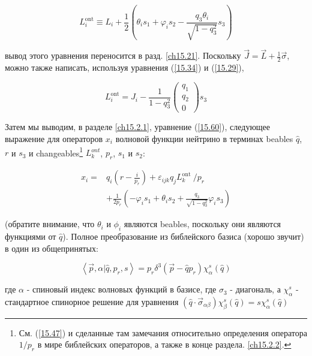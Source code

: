 \documentclass[main.tex]{subfiles}
\begin{document}
\begin{equation}\label{15.36}
	L_{i}^{\mathrm{ont}} \equiv L_{i}+\frac{1}{2}\left(\theta_{i} s_{1}+\varphi_{i} s_{2}-\frac{q_{3} \theta_{i}}{\sqrt{1-q_{3}^{2}}} s_{3}\right)
\end{equation}

вывод этого уравнения переносится в разд. \ref{ch15.21}.
Поскольку $\vec J = \vec L + \frac 1 2\vec\sigma$, можно также написать, используя уравнения (\ref{15.34}) и (\ref{15.29}),

\begin{equation}\label{15.37}
	L_{i}^{\mathrm{ont}}=J_{i}-\frac{1}{1-q_{3}^{2}}\left(\begin{array}{c}{q_{1}} \\ {q_{2}} \\ {0}\end{array}\right) s_{3}
\end{equation}

Затем мы выводим, в разделе \ref{ch15.2.1}, уравнение (\ref{15.60}), следующее выражение для операторов $x_i$ волновой функции нейтрино в терминах beables $\hat q$, $r$ и $s_3$ и changeables\footnote{См. (\ref{15.47}) и сделанные там замечания относительно определения оператора $1/p_r$ в мире библейских операторов, а также в конце раздела. \ref{ch15.2.2}.} $L_k^{ont}$, $p_r$, $s_1$ и $s_2$:

\begin{equation}\label{15.38}
	\begin{aligned} x_{i}=& q_{i}\left(r-\frac{i}{p_{r}}\right)+\varepsilon_{i j k} q_{j} L_{k}^{\text {ont }} / p_{r} \\ &+\frac{1}{2 p_{r}}\left(-\varphi_{i} s_{1}+\theta_{i} s_{2}+\frac{q_{3}}{\sqrt{1-q_{3}^{2}}} \varphi_{i} s_{3}\right) \end{aligned}
\end{equation}

(обратите внимание, что $\theta_i$ и $\phi_i$ являются beables, поскольку они являются функциями от $\hat q$).
Полное преобразование из библейского базиса (хорошо звучит) в один из общепринятых:

\begin{equation}\label{15.39}
	\left\langle\vec{p}, \alpha | \hat{q}, p_{r}, s\right\rangle= p_{r} \delta^{3}\left(\vec{p}-\hat{q} p_{r}\right) \chi_{\alpha}^{s}(\hat{q})
\end{equation}
            
где $\alpha$ - спиновый индекс волновых функций в базисе, где $\sigma_3$ - диагональ, а $\chi^s_\alpha$ - стандартное спинорное решение для уравнения $(\hat q \cdot \vec\sigma_{\alpha\beta})\chi^s_\beta(\hat q) = s\chi^s_\alpha(\hat q)$
\end{document}
